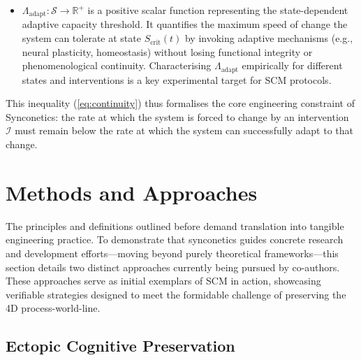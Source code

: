 \documentclass[10pt]{article}
\begin{document}
\begin{sloppypar}
\begin{itemize}
\begin{itemize}
            \item \( \Lambda_{\text{adapt}}: \mathcal{S} \to \mathbb{R}^+ \) is a positive scalar function representing the state-dependent adaptive capacity threshold. It quantifies the maximum speed of change the system can tolerate at state \( S_{\text{crit}}(t) \) by invoking adaptive mechanisms (e.g., neural plasticity, homeostasis) without losing functional integrity or phenomenological continuity. Characterising \( \Lambda_{\text{adapt}} \) empirically for different states and interventions is a key experimental target for SCM protocols.
          \end{itemize}

          This inequality (\autoref{eq:continuity}) thus formalises the core engineering constraint of Synconetics: the rate at which the system is forced to change by an intervention \( \mathcal{I} \) must remain below the rate at which the system can successfully adapt to that change.
  \end{itemize}

  \section{Methods and Approaches}
  \label{sec:methods}

  The principles and definitions outlined before demand translation into tangible engineering practice. To demonstrate that synconetics guides concrete research and development efforts—moving beyond purely theoretical frameworks—this section details two distinct approaches currently being pursued by co-authors. These approaches serve as initial exemplars of SCM in action, showcasing verifiable strategies designed to meet the formidable challenge of preserving the 4D process-world-line.

  \subsection{Ectopic Cognitive Preservation}
  \label{sec:daniel-approach}


\end{sloppypar}
\end{document}

